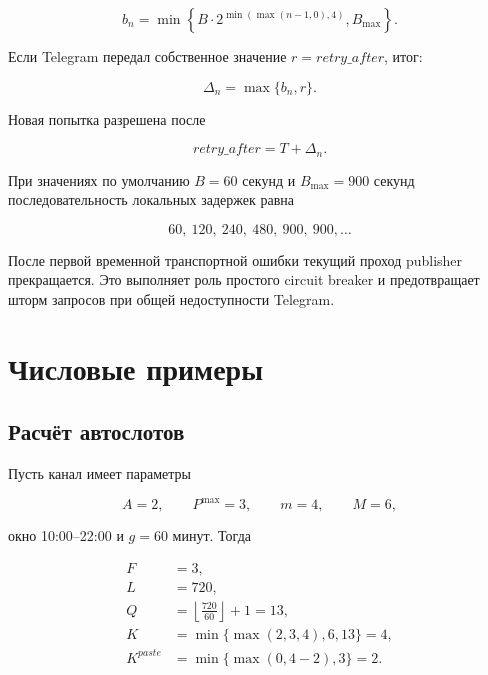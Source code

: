 \documentclass[12pt,a4paper]{article}
\begin{document}
\begin{equation}
  b_n=
  \min\left\{
    B\cdot2^{\min(\max(n-1,0),4)},
    B_{\max}
  \right\}.
  \label{eq:publisher-backoff}
\end{equation}

Если Telegram передал собственное значение $r=retry\_after$, итог:

\begin{equation}
  \Delta_n=\max\{b_n,r\}.
  \label{eq:telegram-retry-after}
\end{equation}

Новая попытка разрешена после

\begin{equation}
  retry\_after=T+\Delta_n.
\end{equation}

При значениях по умолчанию $B=60$ секунд и $B_{\max}=900$ секунд последовательность
локальных задержек равна

\begin{equation}
  60,\ 120,\ 240,\ 480,\ 900,\ 900,\ldots
\end{equation}

После первой временной транспортной ошибки текущий проход publisher прекращается.
Это выполняет роль простого circuit breaker и предотвращает шторм запросов при
общей недоступности Telegram.

\section{Числовые примеры}

\subsection{Расчёт автослотов}

Пусть канал имеет параметры

\begin{equation}
  A=2,\qquad P^{\max}=3,\qquad m=4,\qquad M=6,
\end{equation}

окно 10:00--22:00 и $g=60$ минут. Тогда

\begin{align}
  F&=3,\\
  L&=720,\\
  Q&=\left\lfloor\frac{720}{60}\right\rfloor+1=13,\\
  K&=\min\{\max(2,3,4),6,13\}=4,\\
  K^{paste}&=\min\{\max(0,4-2),3\}=2.
\end{align}
\end{document}
